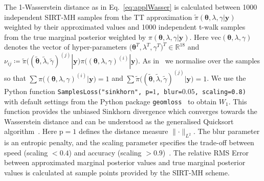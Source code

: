The 1-Wasserstein distance as in Eq.~\ref{eq:applWasser} is calculated between 1000 independent SIRT-MH samples from the TT approximation $\tilde{\pi}( \bm{\theta},\lambda,\gamma  | \bm{y})$ weighted by their approximated values and 1000 independent t-walk samples from the true marginal posterior weighted by $\pi( \bm{\theta},\lambda,\gamma  | \bm{y})$.
Here $\text{vec}( \bm{\theta},\lambda,\gamma )$ denotes the vector of hyper-parameters $\big( \bm{\theta}^T,\lambda^T,\gamma^T \big)^T \in \mathbb{R}^{18}$ and $\nu_{ij} \coloneqq  \tilde{\pi}\big( (\tilde{ \bm{\theta}},  \tilde{\lambda},  \tilde{\gamma})^{(j)}   | \bm{y}\big)  \pi\big( (\bm{\theta},\lambda,\gamma )^{(i)}  | \bm{y}\big) $.
As in~\cite{feydy2020OT} we normalise over the samples so that $\sum \pi\big( (\bm{\theta},\lambda,\gamma )^{(i)}  | \bm{y}\big)  = 1$ and $\sum \tilde{\pi}\big( (\tilde{ \bm{\theta}},  \tilde{\lambda},  \tilde{\gamma})^{(j)}   | \bm{y}\big) = 1$.
We use the Python function \texttt{SamplesLoss("sinkhorn", p=$1$, blur=$0.05$, scaling=0.8)} with default settings from the Python package \texttt{geomloss}~\cite{Wassersteinaccess} to obtain $W_1$.
This function provides the unbiased Sinkhorn divergence which converges towards the Wasserstein distance and can be understood as the generalised Quicksort algorithm~\cite{feydy2020OT}.
Here p$ = 1$ defines the distance measure $\lVert \cdot \rVert_{L^2}$.
The blur parameter is an entropic penalty, and the scaling parameter specifies the trade-off between speed (scaling $< 0.4$) and accuracy (scaling $>0.9$)~\cite{Wassersteinaccess}.
The relative RMS Error between approximated marginal posterior values and true marginal posterior values is calculated at sample points provided by the SIRT-MH scheme.


